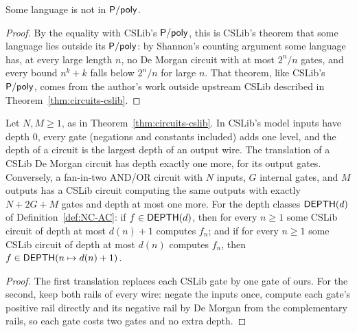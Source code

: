 \begin{corollary}
  \label{cor:circuits-not-ppoly}
  \leanok
  Some language is not in $\mathsf{P/poly}$.
\end{corollary}
\begin{proof}
  \leanok
  By the equality with CSLib's $\mathsf{P/poly}$, this is CSLib's theorem that
  some language lies outside its $\mathsf{P/poly}$: by Shannon's counting argument
  some language has, at every large length $n$, no De Morgan circuit with at
  most $2^n / n$ gates, and every bound $n^k + k$ falls below $2^n / n$ for
  large $n$. That theorem, like CSLib's $\mathsf{P/poly}$, comes from the
  author's work outside upstream CSLib described in
  Theorem~\ref{thm:circuits-cslib}.
\end{proof}

\begin{theorem}
  \label{thm:circuits-cslib-depth}
  \leanok
  Let $N, M \ge 1$, as in Theorem~\ref{thm:circuits-cslib}. In CSLib's model
  inputs have depth $0$, every gate (negations and constants included) adds
  one level, and the depth of a circuit is the largest depth of an output
  wire. The translation of a CSLib De Morgan circuit has depth exactly one
  more, for its output gates. Conversely, a fan-in-two AND/OR circuit with $N$
  inputs, $G$ internal gates, and $M$ outputs has a CSLib circuit computing
  the same outputs with exactly $N + 2G + M$ gates and depth at most one more.
  For the depth classes $\mathsf{DEPTH}(d)$ of Definition~\ref{def:NC-AC}: if
  $f \in \mathsf{DEPTH}(d)$, then for every $n \ge 1$ some CSLib circuit of depth
  at most $d(n) + 1$ computes $f_n$; and if for every $n \ge 1$ some CSLib
  circuit of depth at most $d(n)$ computes $f_n$, then
  $f \in \mathsf{DEPTH}(n \mapsto d(n) + 1)$.
\end{theorem}
\begin{proof}
  \leanok
  The first translation replaces each CSLib gate by one gate of ours. For the
  second, keep both rails of every wire: negate the inputs once, compute each
  gate's positive rail directly and its negative rail by De Morgan from the
  complementary rails, so each gate costs two gates and no extra depth.
\end{proof}

